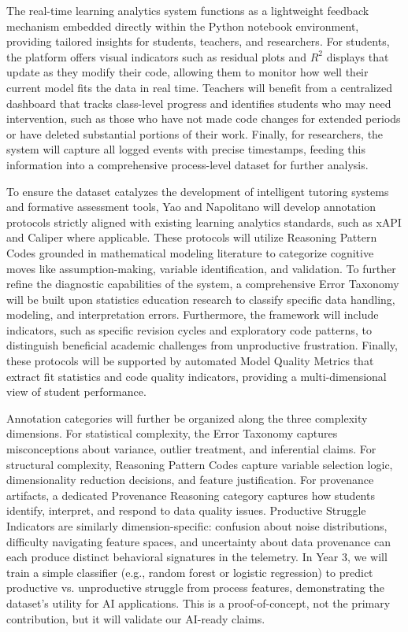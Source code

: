\documentclass[11pt]{article}
\begin{document}
The real-time learning analytics system functions as a lightweight feedback mechanism embedded directly within the Python notebook environment, providing tailored insights for students, teachers, and researchers.
For students, the platform offers visual indicators such as residual plots and $R^2$ displays that update as they modify their code, allowing them to monitor how well their current model fits the data in real time. 
Teachers will benefit from a centralized dashboard that tracks class-level progress and identifies students who may need intervention, such as those who have not made code changes for extended periods or have deleted substantial portions of their work.
Finally, for researchers, the system will capture all logged events with precise timestamps, feeding this information into a comprehensive process-level dataset for further analysis.

To ensure the dataset catalyzes the development of intelligent tutoring systems and formative assessment tools, Yao and Napolitano will develop annotation protocols strictly aligned with existing learning analytics standards, such as xAPI and Caliper where applicable. 
These protocols will utilize Reasoning Pattern Codes grounded in mathematical modeling literature to categorize cognitive moves like assumption-making, variable identification, and validation.
To further refine the diagnostic capabilities of the system, a comprehensive Error Taxonomy will be built upon statistics education research to classify specific data handling, modeling, and interpretation errors. 
Furthermore, the framework will include indicators, such as specific revision cycles and exploratory code patterns, to distinguish beneficial academic challenges from unproductive frustration. 
Finally, these protocols will be supported by automated Model Quality Metrics that extract fit statistics and code quality indicators, providing a multi-dimensional view of student performance.

Annotation categories will further be organized along the three complexity dimensions. 
For statistical complexity, the Error Taxonomy captures misconceptions about variance, outlier treatment, and inferential claims. 
For structural complexity, Reasoning Pattern Codes capture variable selection logic, dimensionality reduction decisions, and feature justification. 
For provenance artifacts, a dedicated Provenance Reasoning category captures how students identify, interpret, and respond to data quality issues. Productive Struggle Indicators are similarly dimension-specific: confusion about noise distributions, difficulty navigating feature spaces, and uncertainty about data provenance can each produce distinct behavioral signatures in the telemetry.
In Year 3, we will train a simple classifier (e.g., random forest or logistic regression) to predict productive vs. unproductive struggle from process features, demonstrating the dataset's utility for AI applications. This is a proof-of-concept, not the primary contribution, but it will validate our AI-ready claims.
\end{document}

